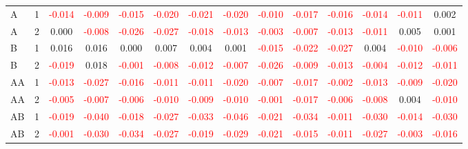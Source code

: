\begin{table}[H]
{\begin{tabular}{llcccccccccccc}
A & 1 & \textcolor{red}{-0.014} & \textcolor{red}{-0.009} & \textcolor{red}{-0.015} & \textcolor{red}{-0.020} & \textcolor{red}{-0.021} & \textcolor{red}{-0.020} & \textcolor{red}{-0.010} & \textcolor{red}{-0.017} & \textcolor{red}{-0.016} & \textcolor{red}{-0.014} & \textcolor{red}{-0.011} & 0.002\\
A & 2 & 0.000 & \textcolor{red}{-0.008} & \textcolor{red}{-0.026} & \textcolor{red}{-0.027} & \textcolor{red}{-0.018} & \textcolor{red}{-0.013} & \textcolor{red}{-0.003} & \textcolor{red}{-0.007} & \textcolor{red}{-0.013} & \textcolor{red}{-0.011} & 0.005 & 0.001\\
B & 1 & 0.016 & 0.016 & 0.000 & 0.007 & 0.004 & 0.001 & \textcolor{red}{-0.015} & \textcolor{red}{-0.022} & \textcolor{red}{-0.027} & 0.004 & \textcolor{red}{-0.010} & \textcolor{red}{-0.006}\\
B & 2 & \textcolor{red}{-0.019} & 0.018 & \textcolor{red}{-0.001} & \textcolor{red}{-0.008} & \textcolor{red}{-0.012} & \textcolor{red}{-0.007} & \textcolor{red}{-0.026} & \textcolor{red}{-0.009} & \textcolor{red}{-0.013} & \textcolor{red}{-0.004} & \textcolor{red}{-0.012} & \textcolor{red}{-0.011}\\
AA & 1 & \textcolor{red}{-0.013} & \textcolor{red}{-0.027} & \textcolor{red}{-0.016} & \textcolor{red}{-0.011} & \textcolor{red}{-0.011} & \textcolor{red}{-0.020} & \textcolor{red}{-0.007} & \textcolor{red}{-0.017} & \textcolor{red}{-0.002} & \textcolor{red}{-0.013} & \textcolor{red}{-0.009} & \textcolor{red}{-0.020}\\
AA & 2 & \textcolor{red}{-0.005} & \textcolor{red}{-0.007} & \textcolor{red}{-0.006} & \textcolor{red}{-0.010} & \textcolor{red}{-0.009} & \textcolor{red}{-0.010} & \textcolor{red}{-0.001} & \textcolor{red}{-0.017} & \textcolor{red}{-0.006} & \textcolor{red}{-0.008} & 0.004 & \textcolor{red}{-0.010}\\
AB & 1 & \textcolor{red}{-0.019} & \textcolor{red}{-0.040} & \textcolor{red}{-0.018} & \textcolor{red}{-0.027} & \textcolor{red}{-0.033} & \textcolor{red}{-0.046} & \textcolor{red}{-0.021} & \textcolor{red}{-0.034} & \textcolor{red}{-0.011} & \textcolor{red}{-0.030} & \textcolor{red}{-0.014} & \textcolor{red}{-0.030}\\
AB & 2 & \textcolor{red}{-0.001} & \textcolor{red}{-0.030} & \textcolor{red}{-0.034} & \textcolor{red}{-0.027} & \textcolor{red}{-0.019} & \textcolor{red}{-0.029} & \textcolor{red}{-0.021} & \textcolor{red}{-0.015} & \textcolor{red}{-0.011} & \textcolor{red}{-0.027} & \textcolor{red}{-0.003} & \textcolor{red}{-0.016}\\

\end{tabular}}
\end{table}
